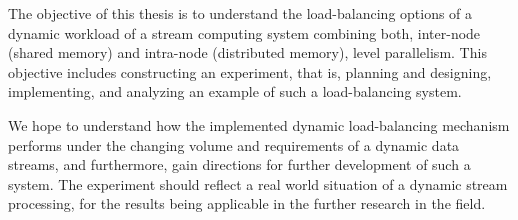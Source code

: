 The objective of this thesis is to understand the load-balancing options of a dynamic workload of a stream computing system combining both, inter-node (shared memory) and intra-node (distributed memory), level parallelism. This objective includes constructing an experiment, that is, planning and designing, implementing, and analyzing an example of such a load-balancing system.

We hope to understand how the implemented dynamic load-balancing mechanism performs under the changing volume and requirements of a dynamic data streams, and furthermore, gain directions for further development of such a system. The experiment should reflect a real world situation of a dynamic stream processing, for the results being applicable in the further research in the field.

